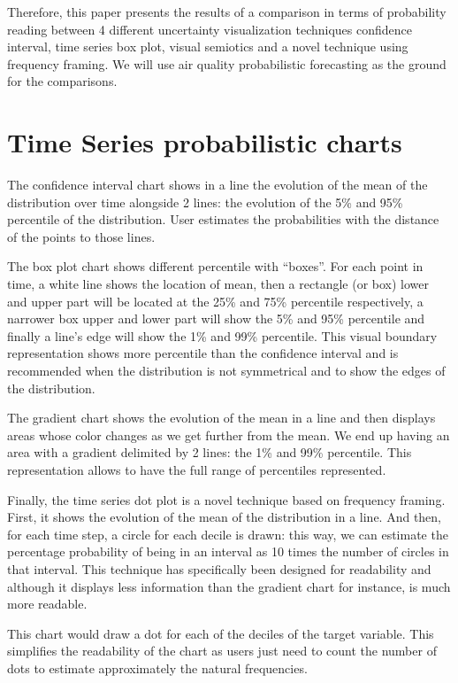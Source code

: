 \documentclass[a4paper,3p,sort&compress]{elsarticle}
\begin{document}
Therefore, this paper presents the results of a comparison in terms of probability reading between 4 different 
uncertainty visualization techniques confidence interval, time series box plot, visual semiotics and a 
novel technique using frequency framing. We will use air quality probabilistic forecasting as the ground 
for the comparisons.

\section{Time Series probabilistic charts} 
\label{sec:time_series}

The confidence interval chart shows in a line the evolution of the mean of the distribution
 over time alongside 2 lines: the evolution of the 5\% and 95\% percentile of the distribution. 
 User estimates the probabilities with the distance of the points to those lines.

The box plot chart shows different percentile with “boxes”. For each point in time, a white 
line shows the location of mean, then a rectangle (or box) lower and upper part will be located 
at the 25\% and 75\% percentile respectively, a narrower box upper and lower part will show 
the 5\% and 95\% percentile and finally a line’s edge will show the 1\% and 99\% percentile. 
This visual boundary representation shows more percentile than the confidence interval and 
is recommended when the distribution is not symmetrical and to show the edges of the distribution.

The gradient chart shows the evolution of the mean in a line and then displays areas whose 
color changes as we get further from the mean. We end up having an area with a gradient 
delimited by 2 lines: the 1\% and 99\% percentile. This representation allows to have the
 full range of percentiles represented.

Finally, the time series dot plot is a novel technique based on frequency framing. First, 
it shows the evolution of the mean of the distribution in a line. And then, for each time 
step, a circle for each decile is drawn: this way, we can estimate the percentage 
probability of being in an interval as 10 times the number of circles in that interval. 
This technique has 
specifically been designed for readability and although it displays less information than 
the gradient chart for instance, is much more readable.

This chart would draw a dot for each of the deciles of the target variable. This simplifies the 
readability of the chart as users just need to count the number of dots to estimate approximately 
the natural frequencies.
\end{document}
